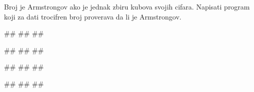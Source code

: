 \begin{Exercise}[label=p1.2_02] 
Broj je Armstrongov ako je jednak zbiru kubova svojih cifara. Napisati program koji za dati trocifren broj proverava da li je Armstrongov.

\begin{miditest}
\begin{upotreba}{1}
#\naslovInt#
##
##
\end{upotreba}
\end{miditest}
\begin{miditest}
\begin{upotreba}{2}
#\naslovInt#
##
##
\end{upotreba}
\end{miditest}

\begin{miditest}
\begin{upotreba}{3}
#\naslovInt#
##
##
\end{upotreba}
\end{miditest}
\begin{miditest}
\begin{upotreba}{4}
#\naslovInt#
##
##
\end{upotreba}
\end{miditest}

\end{Exercise}
\begin{Answer}[ref=p1.2_02]
\end{Answer}

